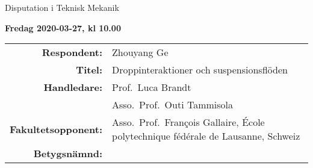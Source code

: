 \begin{frame}[plain]{Disputation i Teknisk Mekanik}
\protect\hypertarget{disputation-i-teknisk-mekanik}{}

\textbf{Fredag 2020-03-27, kl 10.00}

\begin{longtable}[]{@{}rl@{}}
  \toprule
  \endhead
  \begin{minipage}[t]{0.22\columnwidth}\raggedleft
    \textbf{Respondent:}\strut
  \end{minipage} & \begin{minipage}[t]{0.72\columnwidth}\raggedright
    Zhouyang Ge\strut
  \end{minipage}\tabularnewline
  \begin{minipage}[t]{0.22\columnwidth}\raggedleft
    \textbf{Titel:}\strut
  \end{minipage} & \begin{minipage}[t]{0.72\columnwidth}\raggedright
    Droppinteraktioner och suspensionsflöden\strut
  \end{minipage}\tabularnewline
  \begin{minipage}[t]{0.22\columnwidth}\raggedleft
    \textbf{Handledare:}\strut
  \end{minipage} & \begin{minipage}[t]{0.72\columnwidth}\raggedright
    Prof.~Luca Brandt\strut
  \end{minipage}\tabularnewline
  \begin{minipage}[t]{0.22\columnwidth}\raggedleft
    \strut
  \end{minipage} & \begin{minipage}[t]{0.72\columnwidth}\raggedright
    Asso.~Prof.~Outi Tammisola\strut
  \end{minipage}\tabularnewline
  \begin{minipage}[t]{0.22\columnwidth}\raggedleft
    \textbf{Fakultetsopponent:}\strut
  \end{minipage} & \begin{minipage}[t]{0.72\columnwidth}\raggedright
    Asso.~Prof.~Fran\c{c}ois Gallaire, École polytechnique fédérale de Lausanne, Schweiz\strut
  \end{minipage}\tabularnewline
  \begin{minipage}[t]{0.22\columnwidth}\raggedleft
    \textbf{Betygsnämnd:}\strut
  \end{minipage} & \begin{minipage}[t]{0.72\columnwidth}\raggedright

\end{minipage}
\end{longtable}
\end{frame}
